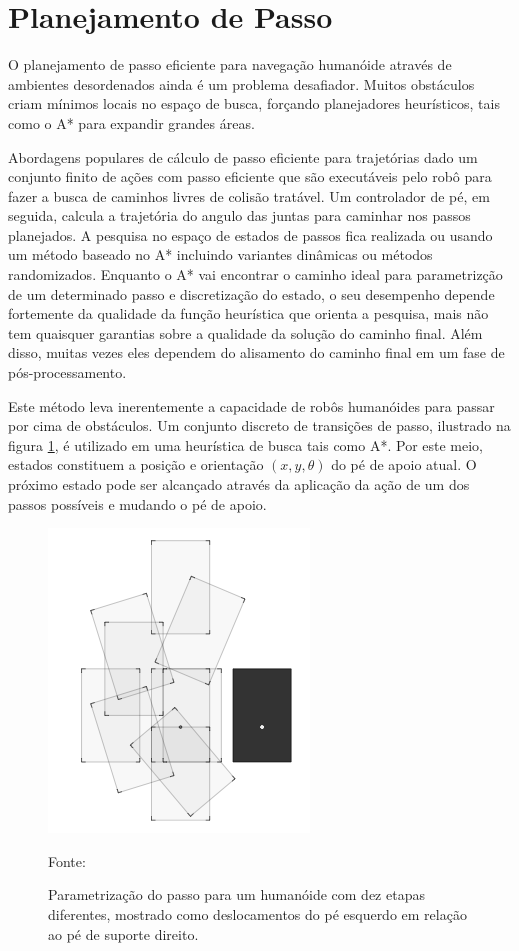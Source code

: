 \documentclass[font=plain]{abnt}
\begin{document}
\section{Planejamento de Passo}
O planejamento de passo eficiente para navegação humanóide através de ambientes desordenados ainda é um problema desafiador. Muitos obstáculos
criam mínimos locais no espaço de busca, forçando planejadores heurísticos, tais como o A* para expandir grandes áreas.

Abordagens populares de cálculo de passo eficiente para trajetórias dado um conjunto finito de ações com passo eficiente que são executáveis
pelo robô para fazer a busca de caminhos livres de colisão tratável. Um controlador de pé, em seguida, calcula a trajetória do angulo das juntas 
para caminhar nos passos planejados. A pesquisa no espaço de estados de passos fica realizada ou usando um método baseado no A* incluindo variantes dinâmicas 
\cite{phornung} \cite{pgarimort} ou métodos randomizados\cite{bperrin}. Enquanto o A* vai encontrar o caminho ideal para parametrizção de um 
determinado passo e discretização do estado, o seu desempenho depende fortemente da qualidade da função heurística que orienta a pesquisa, mais não 
tem quaisquer garantias sobre a qualidade da solução do caminho final. Além disso, muitas vezes eles dependem do alisamento do caminho 
final em um fase de pós-processamento.

Este método leva inerentemente a capacidade de robôs humanóides para passar por cima de obstáculos. Um conjunto discreto de
transições de passo, ilustrado na figura \ref{fig:footstep}, é utilizado em uma heurística de busca tais como A*\cite{bperrin}. Por este meio, estados 
constituem a posição e orientação $( x, y, \theta )$ do pé de apoio atual. O próximo estado pode ser alcançado através da aplicação da ação de 
um dos passos possíveis e mudando o pé de apoio.

\begin{figure}[h]

\centering

\includegraphics[scale=0.48]{figuras/footstep.png}

\caption{Parametrização do passo para um humanóide com dez etapas diferentes, mostrado como deslocamentos do pé esquerdo em 
relação ao pé de suporte direito.} Fonte: \cite{phornung} \label{fig:footstep}

\end{figure}
\FloatBarrier
\end{document}
